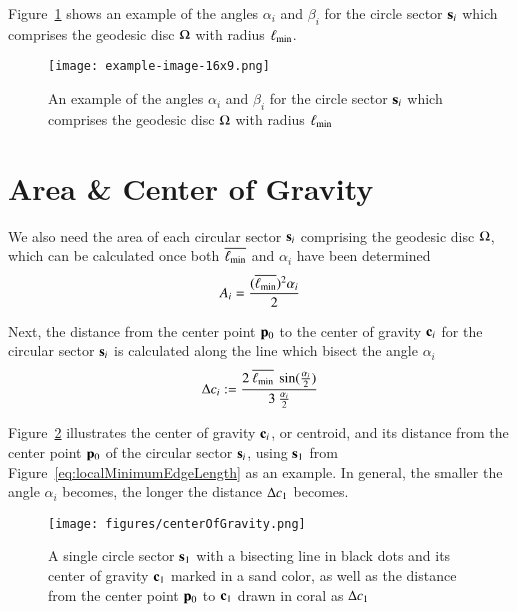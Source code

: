 Figure~\ref{fig:angles} shows an example of the angles $\alpha_i$ and $\beta_i$ for the circle sector $\mathbf{s}_i$ which comprises the geodesic disc $\Omega$ with radius $\ell_\text{min}$.

\begin{figure}[ht]
\ffigbox
	{\texttt{[image: example-image-16x9.png]}}
	{\caption[The angles $\alpha_i$ and $\beta_i$]{An example of the angles $\alpha_i$ and $\beta_i$ for the circle sector $\mathbf{s}_i$  which comprises the geodesic disc $\Omega$ with radius $\ell_\text{min}$}\label{fig:angles}}
\end{figure}%

%
%
%
%
\section{Area \& Center of Gravity}
\label{ch4sACG}
We also need the area of each circular sector $\mathbf{s}_i$ comprising the geodesic disc $\Omega$, which can be calculated once both $\overline{\ell_\text{min}}$ and $\alpha_i$ have been determined
\begin{equation}
	A_i = \frac{(\overline{\ell_\text{min}})^2\alpha_i}{2}
	\label{eq:circularSectorArea}
\end{equation}
%
%

Next, the distance from the center point $\mathbf{p}_0$ to the center of gravity $\mathbf{c}_i$ for the circular sector $\mathbf{s}_i$ is calculated along the line which bisect the angle $\alpha_i$
\begin{equation}
	\Delta c_i := \frac{2\:\overline{\ell_\text{min}}\:\sin(\frac{\alpha_i}{2})}{3\:\frac{\alpha_i}{2}}
	\label{eq:distToCoG}
\end{equation}
%
%

Figure~\ref{fig:centerOfGravity} illustrates the center of gravity $\mathbf{c}_i$, or centroid,  and its distance from the center point $\mathbf{p}_0$ of the circular sector $\mathbf{s}_i$, using $\mathbf{s}_1$ from Figure~\ref{eq:localMinimumEdgeLength} as an example. In general, the smaller the angle $\alpha_i$ becomes, the longer the distance $\Delta c_1$ becomes.
\begin{figure}[ht]
\ffigbox
	{\texttt{[image: figures/centerOfGravity.png]}}
	{\caption[Distance to the Center of Gravity]{A single circle sector $\mathbf{s}_1$ with a bisecting line in black dots and its center of gravity $\mathbf{c}_1$ marked in a sand color, as well as the distance from the center point $\mathbf{p}_0$ to $\mathbf{c}_1$ drawn in coral as $\Delta c_1$}\label{fig:centerOfGravity}}
\end{figure}%
%


